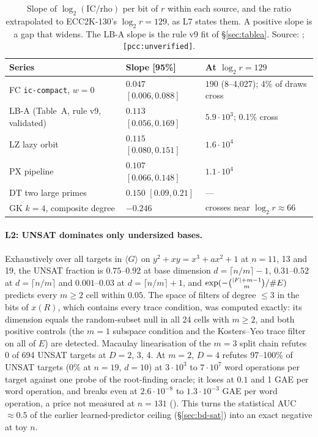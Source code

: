 \begin{table}[t]
\centering\small
\begin{tabular}{@{}lll@{}}
\toprule
Series & Slope [95\%] & At $\log_2r=129$ \\
\midrule
FC \texttt{ic-compact}, $w=0$ & $0.047$ $[0.006,0.088]$ & $190$ (8--4{,}027); 4\% of draws cross \\
LB-A (Table~A, rule v9, validated) & $0.113$ $[0.056,0.169]$ & $5.9\cdot10^3$; 0.1\% cross \\
LZ lazy orbit & $0.115$ $[0.080,0.151]$ & $1.6\cdot10^4$ \\
PX pipeline & $0.107$ $[0.066,0.148]$ & $1.1\cdot10^4$ \\
DT two large primes & $0.150$ $[0.09,0.21]$ & --- \\
GK $k=4$, composite degree & $-0.246$ & crosses near $\log_2r\approx66$ \\
\bottomrule
\end{tabular}
\caption[]{Slope of $\log_2(\text{IC}/\text{rho})$ per bit of $r$ within
each source, and the ratio extrapolated to ECC2K-130's $\log_2r=129$, as L7
states them. A positive slope is a gap that widens. The LB-A slope is the
rule v9 fit of \S\ref{sec:tablea}. Source:
;
\texttt{[pcc:unverified]}.}
\label{tab:bt-open7-slope}
\end{table}

\paragraph{L2: UNSAT dominates only undersized bases.} Exhaustively over
all targets in $\langle G\rangle$ on $y^2+xy=x^3+ax^2+1$ at $n=11$, 13 and
19, the UNSAT fraction is $0.75$--$0.92$ at base dimension
$d=\lceil n/m\rceil-1$, $0.31$--$0.52$ at $d=\lceil n/m\rceil$ and
$0.001$--$0.03$ at $d=\lceil n/m\rceil+1$, and
$\exp(-\binom{\lvert F \rvert+m-1}{m}/\#E)$ predicts every $m\ge2$ cell within
$0.05$. The space of filters of degree $\le3$ in the bits of $x(R)$, which
contains every trace condition, was computed exactly: its dimension equals
the random-subset null in all 24 cells with $m\ge2$, and both positive
controls (the $m=1$ subspace condition and the Kosters--Yeo trace filter on
all of $E$) are detected. Macaulay linearisation of the $m=3$ split chain
refutes 0 of 694 UNSAT targets at $D=2$, 3, 4. At $m=2$, $D=4$ refutes
97--100\% of UNSAT targets (0\% at $n=19$, $d=10$) at $3\cdot10^3$ to
$7\cdot10^7$ word operations per target against one probe of the
root-finding oracle; it loses at $0.1$ and 1 GAE per word operation, and
breaks even at $2.6\cdot10^{-8}$ to $1.3\cdot10^{-3}$ GAE per word
operation, a price not measured at $n=131$
().
This turns the statistical AUC $\approx0.5$ of the earlier learned-predictor
ceiling (\S\ref{sec:bd-sat}) into an exact negative at toy $n$.

